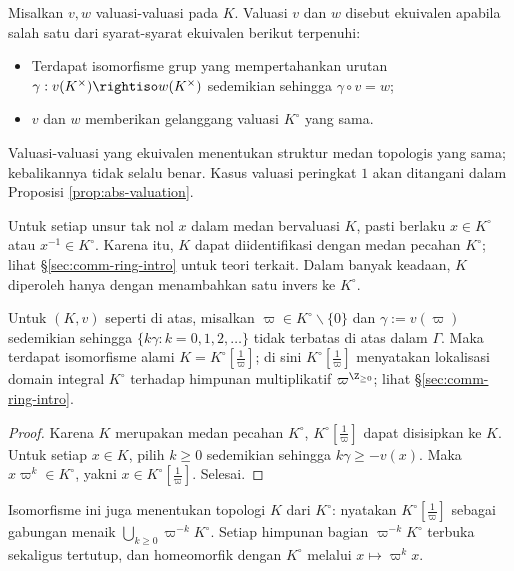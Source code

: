\begin{definition}\label{def:valuation-equiv}
	Misalkan $v, w$ valuasi-valuasi pada $K$. Valuasi $v$ dan $w$ disebut ekuivalen apabila salah satu dari syarat-syarat ekuivalen berikut terpenuhi:
	\begin{itemize}
		\item Terdapat isomorfisme grup yang mempertahankan urutan $\gamma: v(K^\times) \rightiso w(K^\times)$ sedemikian sehingga $\gamma \circ v = w$;
		\item $v$ dan $w$ memberikan gelanggang valuasi $K^\circ$ yang sama.
	\end{itemize}
\end{definition}
Valuasi-valuasi yang ekuivalen menentukan struktur medan topologis yang sama; kebalikannya tidak selalu benar. Kasus valuasi peringkat $1$ akan ditangani dalam Proposisi \ref{prop:abs-valuation}.


Untuk setiap unsur tak nol $x$ dalam medan bervaluasi $K$, pasti berlaku $x \in K^\circ$ atau $x^{-1} \in K^\circ$. Karena itu, $K$ dapat diidentifikasi dengan medan pecahan $K^\circ$; lihat \S\ref{sec:comm-ring-intro} untuk teori terkait. Dalam banyak keadaan, $K$ diperoleh hanya dengan menambahkan satu invers ke $K^\circ$.

\begin{lemma}\label{prop:valuation-localization}
	Untuk $(K, v)$ seperti di atas, misalkan $\varpi \in K^\circ \smallsetminus \{0\}$ dan $\gamma := v(\varpi)$ sedemikian sehingga $\{ k\gamma : k=0,1,2,\ldots \}$ tidak terbatas di atas dalam $\Gamma$. Maka terdapat isomorfisme alami $K = K^\circ[\frac{1}{\varpi}]$; di sini $K^\circ[\frac{1}{\varpi}]$ menyatakan lokalisasi domain integral $K^\circ$ terhadap himpunan multiplikatif $\varpi^{\Z_{\geq 0}}$; lihat \S\ref{sec:comm-ring-intro}.
\end{lemma}
\begin{proof}
	Karena $K$ merupakan medan pecahan $K^\circ$, $K^\circ[\frac{1}{\varpi}]$ dapat disisipkan ke $K$. Untuk setiap $x \in K$, pilih $k \geq 0$ sedemikian sehingga $k\gamma \geq -v(x)$. Maka $x \varpi^k \in K^\circ$, yakni $x \in K^\circ[\frac{1}{\varpi}]$. Selesai.
\end{proof}
Isomorfisme ini juga menentukan topologi $K$ dari $K^\circ$: nyatakan $K^\circ[\frac{1}{\varpi}]$ sebagai gabungan menaik $\bigcup_{k \geq 0} \varpi^{-k} K^\circ$. Setiap himpunan bagian $\varpi^{-k} K^\circ$ terbuka sekaligus tertutup, dan homeomorfik dengan $K^\circ$ melalui $x \mapsto \varpi^k x$.

